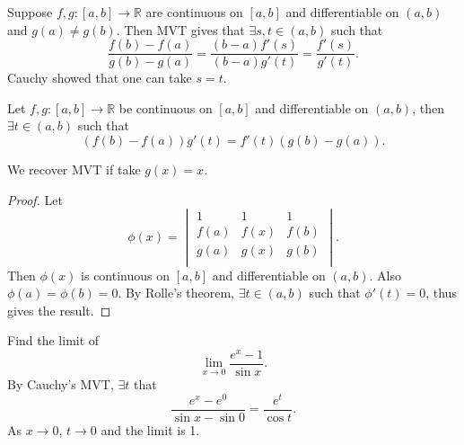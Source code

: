 Suppose $ f,g: [a,b] \to \mathbb{R} $ are continuous on $[a,b]$ and differentiable on $(a,b)$ and $g(a)\neq g(b)$. Then MVT gives that $ \exists s,t\in (a,b) $ such that 
\[
    \frac{f(b)-f(a)}{g(b)-g(a)}=\frac{(b-a)f'(s)}{(b-a)g'(t)}=\frac{f'(s)}{g'(t)}.
\]
Cauchy showed that one can take $s=t$.
\begin{theorem}\label{thm:Cauchy}
    Let $f,g:[a,b]\to \mathbb{R}$ be continuous on $[a,b]$ and differentiable on $(a,b)$, then $ \exists t\in (a,b) $ such that 
    \[
        (f(b)-f(a))g'(t)=f'(t)(g(b)-g(a)).
    \]
\end{theorem}
\begin{note}
    We recover MVT if take $g(x)=x$.
\end{note}
\begin{proof}
    Let 
    \[
        \phi(x) = \begin{vmatrix}
            1 & 1 & 1 \\
            f(a) & f(x) & f(b) \\
            g(a) & g(x) & g(b) \\
        \end{vmatrix}.
    \]
    Then $ \phi(x) $ is continuous on $[a,b]$ and differentiable on $(a,b)$. Also $ \phi(a)=\phi(b)=0 $. By Rolle's theorem, $ \exists t\in(a,b) $ such that $ \phi'(t)=0 $, thus gives the result.
\end{proof}
\begin{example}
    Find the limit of 
    \[
        \lim_{x \to 0} \frac{e^x-1}{\sin x}.
    \]
    By Cauchy's MVT, $\exists t$ that
    \[
        \frac{e^x-e^0}{\sin x-\sin 0} = \frac{e^t}{\cos t}.
    \]
    As $x\to 0$, $t\to 0$ and the limit is 1.
\end{example}

